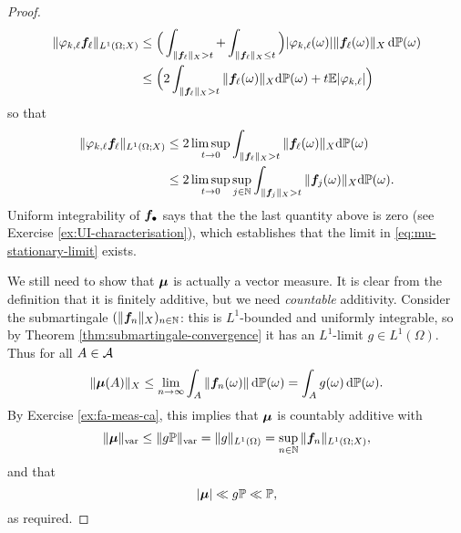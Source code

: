 \begin{proof}
\begin{equation*}
     \begin{aligned}
       \|  \varphi_{k,\ell}  \bm{f}_\ell \|_{L^1(\Omega;X)}
       &\leq \Big( \int_{\|\bm{f}_{\ell}\|_{X} > t} + \int_{\|\bm{f}_{\ell}\|_{X} \leq t} \Big) |\varphi_{k,\ell}(\omega)| \|\bm{f}_{\ell}(\omega)\|_{X} \, \mathrm{d}\mathbb{P}(\omega) \\
       &\leq \Big( 2\int_{\|\bm{f}_{\ell}\|_{X} > t} \|\bm{f}_{\ell}(\omega)\|_{X} \mathrm{d}\mathbb{P}(\omega) + t\mathbb{E}|\varphi_{k,\ell}| \Big)
     \end{aligned}
   \end{equation*}
   so that
   \begin{equation*}
     \begin{aligned}
       \|  \varphi_{k,\ell} \bm{f}_\ell  \|_{L^1(\Omega;X)}
       &\leq 2\limsup_{t \to 0} \int_{\|\bm{f}_{\ell}\|_{X} > t} \|\bm{f}_{\ell}(\omega)\|_{X} \mathrm{d}\mathbb{P}(\omega) \\
       &\leq 2\limsup_{t \to 0} \sup_{j \in \mathbb{N}}  \int_{\|\bm{f}_{j}\|_{X} > t} \|\bm{f}_{j}(\omega)\|_{X} \mathrm{d}\mathbb{P}(\omega).
   \end{aligned}
 \end{equation*}
 Uniform integrability of $\bm{f}_{\bullet}$ says that the the last quantity above is zero (see Exercise \ref{ex:UI-characterisation}), which establishes that the limit in \eqref{eq:mu-stationary-limit} exists.

 We still need to show that $\bm{\mu}$ is actually a vector measure.
 It is clear from the definition that it is finitely additive, but we need \emph{countable} additivity.
 Consider the submartingale $(\|\bm{f}_n\|_{X})_{n \in \mathbb{N}}$: this is $L^1$-bounded and uniformly integrable, so by Theorem \ref{thm:submartingale-convergence} it has an $L^1$-limit $g \in L^1(\Omega)$.
 Thus for all $A \in \mathcal{A}$
 \begin{equation*}
   \|\bm{\mu}(A)\|_{X} \leq \lim_{n \to \infty} \int_{A} \|\bm{f}_n(\omega)\| \, \mathrm{d}\mathbb{P}(\omega) = \int_{A} g(\omega) \, \mathrm{d}\mathbb{P}(\omega).
 \end{equation*}
 By Exercise \ref{ex:fa-meas-ca}, this implies that $\bm{\mu}$ is countably additive with
 \begin{equation*}
   \|\bm{\mu}\|_{\mathrm{var}} \leq \|g\mathbb{P}\|_{\mathrm{var}} = \|g\|_{L^1(\Omega)} = \sup_{n \in \mathbb{N}} \|\bm{f}_n\|_{L^1(\Omega;X)},
 \end{equation*}
 and that
 \begin{equation*}
   |\bm{\mu}| \ll g\mathbb{P} \ll \mathbb{P},
 \end{equation*}
 as required.
\end{proof}


